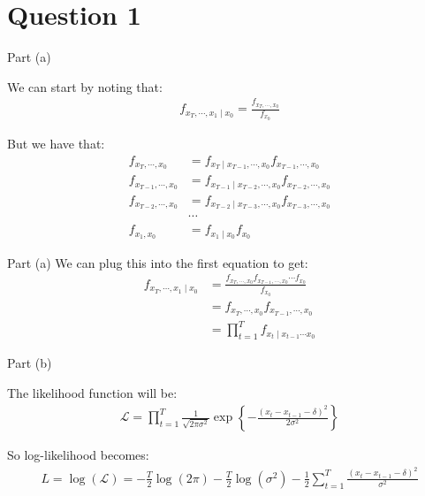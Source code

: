 \section{Question 1}

\begin{frame}{Part (a)}
    
    We can start by noting that:
    \begin{align*}
        f_{x_T, \cdots, x_1 \mid x_0} = \frac{f_{x_T, \cdots, x_0}}{f_{x_0}}
    \end{align*}
    
    But we have that:
    \begin{align*}
        f_{x_T, \cdots, x_0} &= f_{x_T \mid x_{T-1}, \cdots, x_0} f_{x_{T-1}, \cdots, x_0}
        \\
        f_{x_{T-1}, \cdots, x_0} &= f_{x_{T-1} \mid x_{T-2}, \cdots, x_0} f_{x_{T-2}, \cdots, x_0}
        \\
        f_{x_{T-2}, \cdots, x_0} &= f_{x_{T-2} \mid x_{T-3}, \cdots, x_0} f_{x_{T-3}, \cdots, x_0}
        \\
        &\cdots
        \\
        f_{x_1, x_0} &= f_{x_1 \mid x_0} f_{x_0}
    \end{align*}
    
\end{frame}

\begin{frame}{Part (a)}
    We can plug this into the first equation to get:
    \begin{align*}
        f_{x_T, \cdots, x_1 \mid x_0} &= \frac{ f_{x_T, \cdots, x_0}  f_{x_{T-1}, \cdots, x_0} \cdots f_{x_0}}{f_{x_0}}
        \\
        &=  f_{x_T, \cdots, x_0}  f_{x_{T-1}, \cdots, x_0}
        \\
        &= \prod_{t=1}^T f_{x_t \mid x_{t-1} \cdots x_0}
    \end{align*}
        
\end{frame}

\begin{frame}{Part (b)}

    The likelihood function will be:
    \begin{align*}
        \mathcal{L} = \prod_{t=1}^T \frac{1}{\sqrt{2 \pi \sigma^2}}\exp \left\{ - \frac{(x_t - x_{t-1} - \delta)^2}{2 \sigma^2} \right\}
    \end{align*}
    
    So log-likelihood becomes:
    \begin{align*}
        L = \log (\mathcal{L}) = - \frac{T}{2} \log (2 \pi) - \frac{T}{2} \log (\sigma^2) - \frac{1}{2} \sum_{t=1}^T \frac{(x_t - x_{t-1} - \delta)^2}{\sigma^2}
    \end{align*}
    
\end{frame}

